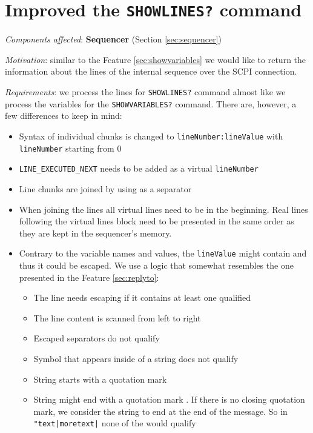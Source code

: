 \section{Improved the \texttt{SHOWLINES?} command}
\label{sec:showlines}

\textit{Components affected}: \textbf{Sequencer} (Section \ref{sec:sequencer})

\textit{Motivation}: similar to the Feature \ref{sec:showvariables} we would like to return the information about the lines of the internal sequence over the SCPI connection.

\textit{Requirements}: we process the lines for \texttt{SHOWLINES?} command almost like we process the variables for the \texttt{SHOWVARIABLES?} command. There are, however, a few differences to keep in mind:

\begin{itemize}
	\item Syntax of individual chunks is changed to \texttt{lineNumber:lineValue} with \texttt{lineNumber} starting from 0
	\item \texttt{LINE\_EXECUTED\_NEXT} needs to be added as a virtual \texttt{lineNumber}
	\item Line chunks are joined by using \highlight{|} as a separator
	\item When joining the lines all virtual lines need to be in the beginning. Real lines following the virtual lines block need to be presented in the same order as they are kept in the sequencer's memory.
	\item{
		Contrary to the variable names and values, the \texttt{lineValue} might contain \highlight{|} and thus it could be escaped. We use a logic that somewhat resembles the one presented in the Feature \ref{sec:replyto}:
		\begin{itemize}
			\item The line needs escaping if it contains at least one qualified \highlight{|}
			\item The line content is scanned from left to right		
			\item Escaped separators \highlight{\textbackslash |} do not qualify
			\item Symbol \highlight{|} that appears inside of a string does not qualify
			\item String starts with a quotation mark 
			\item String might end with a quotation mark . If there is no closing quotation mark, we consider the string to end at the end of the message. So in \texttt{"text|moretext|} none of the \highlight{|} would qualify

\end{itemize}}
\end{itemize}
